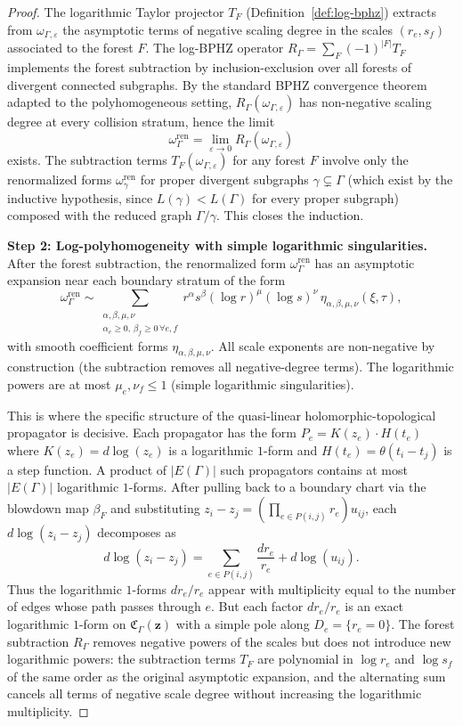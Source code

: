 \begin{proof}
The logarithmic Taylor projector $T_F$ (Definition~\ref{def:log-bphz}) extracts from $\omega_{\Gamma,\varepsilon}$ the asymptotic terms of negative scaling degree in the scales $(r_e, s_f)$ associated to the forest $F$. The log-BPHZ operator $R_\Gamma = \sum_F (-1)^{|F|} T_F$ implements the forest subtraction by inclusion-exclusion over all forests of divergent connected subgraphs. By the standard BPHZ convergence theorem adapted to the polyhomogeneous setting, $R_\Gamma(\omega_{\Gamma,\varepsilon})$ has non-negative scaling degree at every collision stratum, hence the limit
\[
 \omega_\Gamma^{\mathrm{ren}} = \lim_{\varepsilon \to 0} R_\Gamma(\omega_{\Gamma,\varepsilon})
\]
exists. The subtraction terms $T_F(\omega_{\Gamma,\varepsilon})$ for any forest $F$ involve only the renormalized forms $\omega_\gamma^{\mathrm{ren}}$ for proper divergent subgraphs $\gamma \subsetneq \Gamma$ (which exist by the inductive hypothesis, since $L(\gamma) < L(\Gamma)$ for every proper subgraph) composed with the reduced graph $\Gamma/\gamma$. This closes the induction.

\medskip
\textbf{Step 2: Log-polyhomogeneity with simple logarithmic singularities.}
After the forest subtraction, the renormalized form $\omega_\Gamma^{\mathrm{ren}}$ has an asymptotic expansion near each boundary stratum of the form
\[
 \omega_\Gamma^{\mathrm{ren}} \sim \sum_{\substack{\alpha,\beta,\mu,\nu \\ \alpha_e \ge 0,\, \beta_f \ge 0\, \forall e,f}} r^\alpha s^\beta (\log r)^\mu (\log s)^\nu\, \eta_{\alpha,\beta,\mu,\nu}(\xi,\tau),
\]
with smooth coefficient forms $\eta_{\alpha,\beta,\mu,\nu}$. All scale exponents are non-negative by construction (the subtraction removes all negative-degree terms). The logarithmic powers are at most $\mu_e, \nu_f \le 1$ (simple logarithmic singularities).

This is where the specific structure of the quasi-linear holomorphic-topological propagator is decisive. Each propagator has the form $P_e = K(z_e) \cdot H(t_e)$ where $K(z_e) = d\log(z_e)$ is a logarithmic $1$-form and $H(t_e) = \theta(t_i - t_j)$ is a step function. A product of $|E(\Gamma)|$ such propagators contains at most $|E(\Gamma)|$ logarithmic $1$-forms. After pulling back to a boundary chart via the blowdown map $\beta_F$ and substituting $z_i - z_j = (\prod_{e \in P(i,j)} r_e) u_{ij}$, each $d\log(z_i - z_j)$ decomposes as
\[
 d\log(z_i - z_j) = \sum_{e \in P(i,j)} \frac{dr_e}{r_e} + d\log(u_{ij}).
\]
Thus the logarithmic $1$-forms $dr_e/r_e$ appear with multiplicity equal to the number of edges whose path passes through $e$. But each factor $dr_e/r_e$ is an exact logarithmic $1$-form on $\mathfrak C_\Gamma(\mathbf z)$ with a simple pole along $D_e = \{r_e = 0\}$. The forest subtraction $R_\Gamma$ removes negative powers of the scales but does not introduce new logarithmic powers: the subtraction terms $T_F$ are polynomial in $\log r_e$ and $\log s_f$ of the same order as the original asymptotic expansion, and the alternating sum cancels all terms of negative scale degree without increasing the logarithmic multiplicity.


\end{proof}
